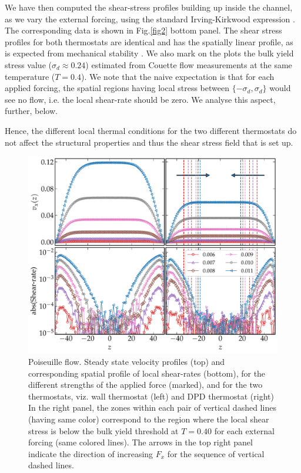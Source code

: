 We have then computed the shear-stress profiles building up inside the channel, as we vary the external forcing, using the standard Irving-Kirkwood expression \cite{todd1995pressure}. The corresponding data is shown in Fig.\ref{fig2} bottom panel. The shear stress profiles for both thermostats are identical and has the spatially linear profile, as is expected from mechanical stability \cite{todd1995pressure}. We also mark on the plots the bulk yield stress value ($\sigma_d \approx 0.24$) estimated from Couette flow measurements at the same temperature ($T=0.4$). We note that the naive expectation is that for each applied forcing, the spatial regions having local stress between $\{-\sigma_d, \sigma_d\}$ would see no flow, i.e. the local shear-rate should be zero. We analyse this aspect, further, below.

Hence, the different local thermal conditions for the two different thermostats do not affect the structural properties and thus the shear stress field that is set up. 


\begin{figure}
\centering
\includegraphics[width=15cm]{figs/velVelGrad.pdf}
\caption[{\em Steady state velocity profiles and corresponding spatial profile of local shear-rates for the different strengths of the applied force, for the two thermostats}]{Poiseuille flow. Steady state velocity profiles (top) and corresponding spatial profile of local shear-rates (bottom), for the different strengths of the applied force (marked), and for the two thermostats, viz. wall thermostat (left) and DPD thermostat (right) In the right panel, the zones within each pair of vertical dashed lines (having same color) correspond to the region where the local shear stress is below the bulk yield threshold at $T=0.40$ for each external forcing (same colored lines). The arrows in the top right panel indicate the direction of increasing $F_x$ for the sequence of vertical dashed lines.}
\label{velocityprofiles}
\end{figure}



